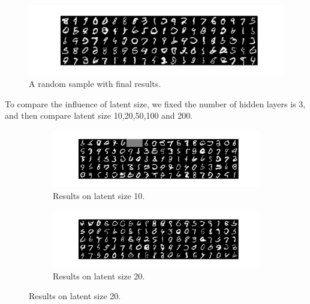 \documentclass[12pt,letterpaper]{article}
\begin{document}
\begin{figure}[h]
    \centering
    \includegraphics[width=.6\linewidth]{GAN_MNIST_0_100_256results.png}
    \caption{\small A random sample with final results.}
    \label{fig:MNIST_GAN_latent_results}
\end{figure}

To compare the influence of latent size, we fixed the number of hidden layers is $3$, and then compare latent size 10,20,50,100 and 200.

\begin{figure}[h]
    \begin{subfigure}{0.49\textwidth}
    \includegraphics[width=\linewidth]{GAN_MNIST_0_10_256.png}
    \caption{\small Results on latent size 10.} \label{fig:a}
    \end{subfigure}\hspace*{\fill}
    \begin{subfigure}{0.49\textwidth}
    \includegraphics[width=\linewidth]{GAN_MNIST_0_20_256.png}
    \caption{\small Results on latent size 20.} \label{fig:b}
    \end{subfigure}
    

\end{figure}
\end{document}
